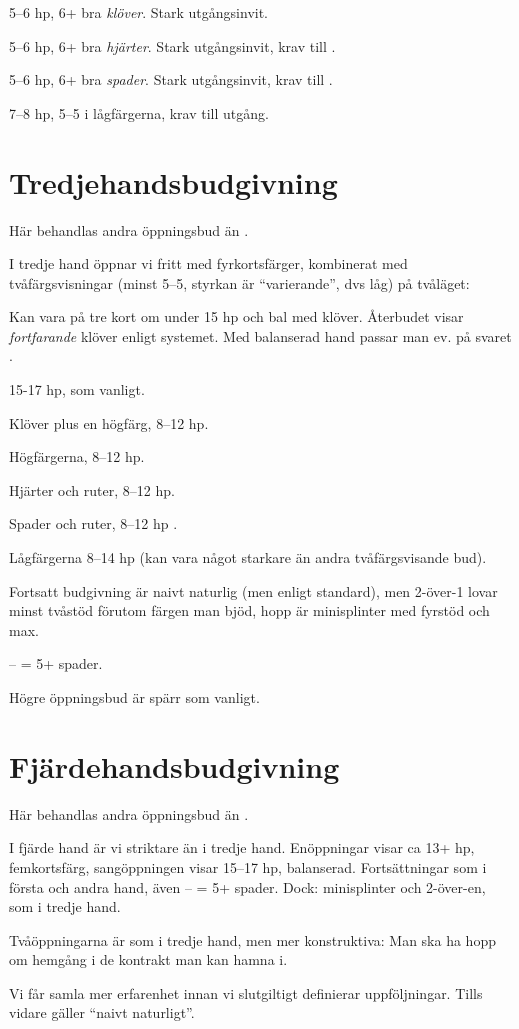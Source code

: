 \item[--\kl{2}] 5--6 hp, 6+ bra \emph{klöver}. Stark utgångsinvit.
\item[--\ru{2}] 5--6 hp, 6+ bra \emph{hjärter}. Stark utgångsinvit, krav
  till .
\item[--\hj{2}] 5--6 hp, 6+ bra \emph{spader}. Stark utgångsinvit, krav
  till .
\item[--\spa{2}] 7--8 hp, 5--5 i lågfärgerna, krav till utgång.  
    
\ebe

\section{Tredjehandsbudgivning}

Här behandlas andra öppningsbud än .

I tredje hand öppnar vi fritt med fyrkortsfärger,
  kombinerat med 
tvåfärgsvisningar (minst 5--5, styrkan är ``varierande'', dvs låg) på tvåläget:

\bbe
\item[\ru{1}] Kan vara på tre kort om under 15 hp och bal med
  klöver. Återbudet  visar \emph{fortfarande} klöver enligt
  systemet. Med balanserad hand passar man ev. på svaret . 
\item[\NT{1}] 15-17 hp, som vanligt.
\item[\kl{2}] Klöver plus en högfärg, 8--12 hp.
\item[\ru{2}] Högfärgerna, 8--12 hp.
\item[\hj{2}] Hjärter och ruter, 8--12 hp.
\item[\spa{2}] Spader och ruter, 8--12 hp .
\item[\NT{2}] Lågfärgerna 8--14 hp (kan vara något starkare än andra
  tvåfärgsvisande bud).
\ebe

Fortsatt budgivning är naivt naturlig (men enligt standard), men 2-över-1 lovar minst tvåstöd
förutom färgen man bjöd, hopp är minisplinter med fyrstöd och max.

-- = 5+ spader.

Högre öppningsbud är spärr som vanligt.  

\section{Fjärdehandsbudgivning}

Här behandlas andra öppningsbud än .

I fjärde hand är vi striktare än i tredje hand. Enöppningar visar ca 13+
hp, femkortsfärg, sangöppningen visar 15--17 hp, balanserad. Fortsättningar
som i första och andra hand, även -- = 5+ spader. Dock:
minisplinter och 2-över-en, som i tredje hand. 

Tvåöppningarna är som i tredje hand, men mer konstruktiva: Man ska ha hopp
om hemgång i de kontrakt man kan hamna i.

Vi får samla mer erfarenhet innan vi slutgiltigt definierar
uppföljningar. Tills vidare gäller ``naivt naturligt''.
